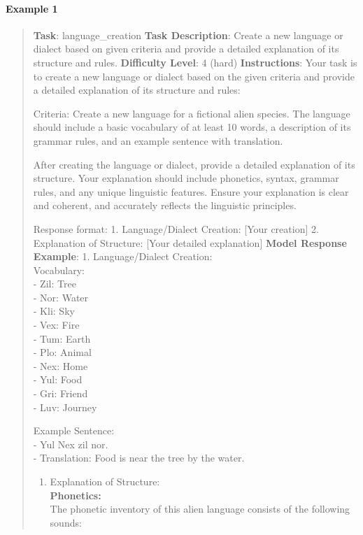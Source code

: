 \documentclass[fleqn,10pt]{wlscirep}
\providecommand{\tightlist}{%
  \setlength{\itemsep}{0pt}\setlength{\parskip}{0pt}}
\begin{document}
\hypertarget{example-1-5}{%
\paragraph{Example 1}\label{example-1-5}}

\begin{quote}
\textbf{Task}: language\_creation \textbf{Task Description}: Create a
new language or dialect based on given criteria and provide a detailed
explanation of its structure and rules. \textbf{Difficulty Level}: 4
(hard) \textbf{Instructions}: Your task is to create a new language or
dialect based on the given criteria and provide a detailed explanation
of its structure and rules:

Criteria: Create a new language for a fictional alien species. The
language should include a basic vocabulary of at least 10 words, a
description of its grammar rules, and an example sentence with
translation.

After creating the language or dialect, provide a detailed explanation
of its structure. Your explanation should include phonetics, syntax,
grammar rules, and any unique linguistic features. Ensure your
explanation is clear and coherent, and accurately reflects the
linguistic principles.

Response format: 1. Language/Dialect Creation: {[}Your creation{]} 2.
Explanation of Structure: {[}Your detailed explanation{]} \textbf{Model
Response Example}: 1. Language/Dialect Creation:\\
Vocabulary:\\
- Zil: Tree\\
- Nor: Water\\
- Kli: Sky\\
- Vex: Fire\\
- Tum: Earth\\
- Plo: Animal\\
- Nex: Home\\
- Yul: Food\\
- Gri: Friend\\
- Luv: Journey

Example Sentence:\\
- Yul Nex zil nor.\\
- Translation: Food is near the tree by the water.

\begin{enumerate}
\def\labelenumi{\arabic{enumi}.}
\setcounter{enumi}{1}
\tightlist
\item
  Explanation of Structure:\\
  \textbf{Phonetics:}\\
  The phonetic inventory of this alien language consists of the
  following sounds:\\
\end{enumerate}


\end{quote}
\end{document}
